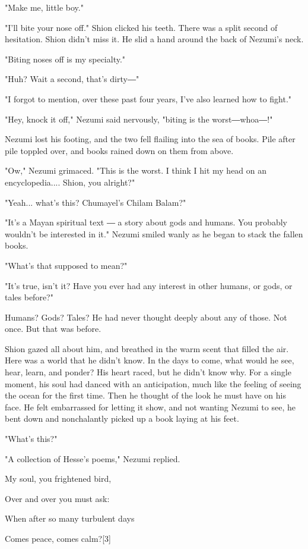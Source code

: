 "Make me, little boy."

"I'll bite your nose off." Shion clicked his teeth. There was a split
second of hesitation. Shion didn't miss it. He slid a hand around the
back of Nezumi's neck.

"Biting noses off is my specialty."

"Huh? Wait a second, that's dirty―"

"I forgot to mention, over these past four years, I've also learned how
to fight."

"Hey, knock it off," Nezumi said nervously, "biting is the worst―whoa―!"

Nezumi lost his footing, and the two fell flailing into the sea of
books. Pile after pile toppled over, and books rained down on them from
above.

"Ow," Nezumi grimaced. "This is the worst. I think I hit my head on an
encyclopedia.... Shion, you alright?"

"Yeah... what's this? Chumayel's Chilam Balam?"

"It's a Mayan spiritual text ― a story about gods and humans. You
probably wouldn't be interested in it." Nezumi smiled wanly as he began
to stack the fallen books.

"What's that supposed to mean?"

"It's true, isn't it? Have you ever had any interest in other humans, or
gods, or tales before?"

Humans? Gods? Tales? He had never thought deeply about any of those. Not
once. But that was before.

Shion gazed all about him, and breathed in the warm scent that filled
the air. Here was a world that he didn't know. In the days to come, what
would he see, hear, learn, and ponder? His heart raced, but he didn't
know why. For a single moment, his soul had danced with an anticipation,
much like the feeling of seeing the ocean for the first time. Then he
thought of the look he must have on his face. He felt embarrassed for
letting it show, and not wanting Nezumi to see, he bent down and
nonchalantly picked up a book laying at his feet.

"What's this?"

"A collection of Hesse's poems," Nezumi replied.

My soul, you frightened bird,

Over and over you must ask:

When after so many turbulent days

Comes peace, comes calm?{[}3{]}

